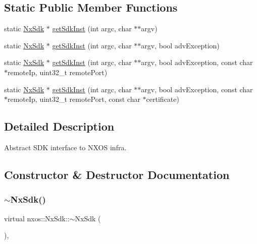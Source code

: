 \subsection*{Static Public Member Functions}
\begin{DoxyCompactItemize}
\item 
static \mbox{\hyperlink{classnxos_1_1_nx_sdk}{Nx\+Sdk}} $\ast$ \mbox{\hyperlink{classnxos_1_1_nx_sdk_a5050e2d26c40744b4fc7862068a83f39}{get\+Sdk\+Inst}} (int argc, char $\ast$$\ast$argv)
\item 
static \mbox{\hyperlink{classnxos_1_1_nx_sdk}{Nx\+Sdk}} $\ast$ \mbox{\hyperlink{classnxos_1_1_nx_sdk_acdeb12edbd291b5421ddb3260547bf8a}{get\+Sdk\+Inst}} (int argc, char $\ast$$\ast$argv, bool adv\+Exception)
\item 
static \mbox{\hyperlink{classnxos_1_1_nx_sdk}{Nx\+Sdk}} $\ast$ \mbox{\hyperlink{classnxos_1_1_nx_sdk_aced70eb68eaccdd3c11f36c21575ade0}{get\+Sdk\+Inst}} (int argc, char $\ast$$\ast$argv, bool adv\+Exception, const char $\ast$remote\+Ip, uint32\+\_\+t remote\+Port)
\item 
static \mbox{\hyperlink{classnxos_1_1_nx_sdk}{Nx\+Sdk}} $\ast$ \mbox{\hyperlink{classnxos_1_1_nx_sdk_a225be30e47270295fbe08151b4745692}{get\+Sdk\+Inst}} (int argc, char $\ast$$\ast$argv, bool adv\+Exception, const char $\ast$remote\+Ip, uint32\+\_\+t remote\+Port, const char $\ast$certificate)
\end{DoxyCompactItemize}


\subsection{Detailed Description}
Abstract S\+DK interface to N\+X\+OS infra. 

\subsection{Constructor \& Destructor Documentation}
\mbox{\label{classnxos_1_1_nx_sdk_a6b5028045019af4be6c8356ec0fdaff9}} 
\subsubsection{\texorpdfstring{$\sim$\+Nx\+Sdk()}{~NxSdk()}}
{\footnotesize\ttfamily virtual nxos\+::\+Nx\+Sdk\+::$\sim$\+Nx\+Sdk (\begin{DoxyParamCaption}{ }\end{DoxyParamCaption})\hspace{0.3cm}{\ttfamily [inline]}, {\ttfamily [virtual]}}

